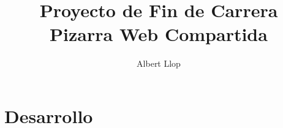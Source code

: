 \documentclass [11pt]{report}
\begin{document}
\author{Albert Llop}
\title{\Huge{\textbf{Proyecto de Fin de Carrera} \\ Pizarra Web Compartida}}
\maketitle
\newpage
\tableofcontents
\chapter{Desarrollo}

\newpage

\newpage

\end{document}
